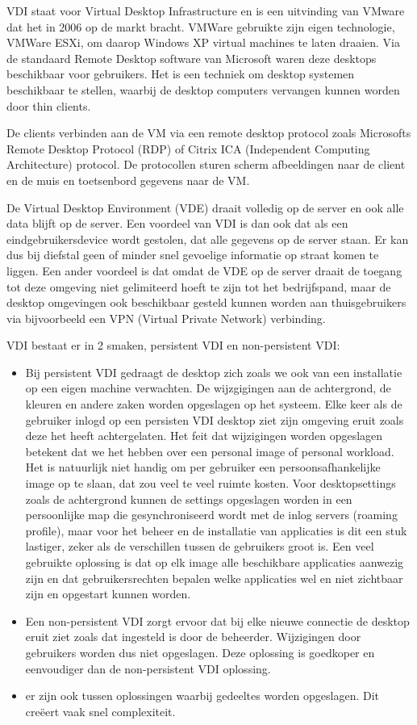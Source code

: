 VDI staat voor Virtual Desktop Infrastructure en is een uitvinding van VMware dat het in 2006 op de markt bracht. VMWare gebruikte zijn eigen technologie, VMWare ESXi, om daarop Windows XP virtual machines te laten draaien. Via de standaard Remote Desktop software van Microsoft waren deze desktops beschikbaar voor gebruikers. Het is een techniek om desktop systemen beschikbaar te stellen, waarbij de desktop computers vervangen kunnen worden door thin clients.

De clients verbinden aan de VM via een remote desktop protocol zoals Microsofts Remote Desktop Protocol (RDP) of Citrix ICA (Independent Computing Architecture) protocol. De protocollen sturen scherm afbeeldingen naar de client en de muis en toetsenbord gegevens naar de VM.

De Virtual Desktop Environment (VDE) draait volledig op de server en ook alle data blijft op de server. Een voordeel van VDI is dan ook dat als een eindgebruikersdevice wordt gestolen, dat alle gegevens op de server staan. Er kan dus bij diefstal geen of minder snel gevoelige informatie op straat komen te liggen. Een ander voordeel is dat omdat de VDE op de server draait de toegang tot deze omgeving niet gelimiteerd hoeft te zijn tot het bedrijfspand, maar de desktop omgevingen ook beschikbaar gesteld kunnen worden aan thuisgebruikers via bijvoorbeeld een VPN (Virtual Private Network) verbinding.

VDI bestaat er in 2 smaken, persistent VDI en non-persistent VDI:
\begin{itemize}
\item Bij persistent VDI gedraagt de desktop zich zoals we ook van een installatie op een eigen machine verwachten. De wijzgigingen aan de achtergrond, de kleuren en andere zaken worden opgeslagen op het systeem. Elke keer als de gebruiker inlogd op een persisten VDI desktop ziet zijn omgeving eruit zoals deze het heeft achtergelaten. Het feit dat wijzigingen worden opgeslagen betekent dat we het hebben over een personal image of personal workload. Het is natuurlijk niet handig om per gebruiker een persoonsafhankelijke image op te slaan, dat zou veel te veel ruimte kosten. Voor desktopsettings zoals de achtergrond kunnen de settings opgeslagen worden in een persoonlijke map die gesynchroniseerd wordt met de inlog servers (roaming profile), maar voor het beheer en de installatie van applicaties is dit een stuk lastiger, zeker als de verschillen tussen de gebruikers groot is. Een veel gebruikte oplossing is dat op elk image alle beschikbare applicaties aanwezig zijn en dat gebruikersrechten bepalen welke applicaties wel en niet zichtbaar zijn en opgestart kunnen worden.
\item Een non-persistent VDI zorgt ervoor dat bij elke nieuwe connectie de desktop eruit ziet zoals dat ingesteld is door de beheerder. Wijzigingen door gebruikers worden dus niet opgeslagen. Deze oplossing is goedkoper en eenvoudiger dan de non-persistent VDI oplossing.
\item er zijn ook tussen oplossingen waarbij gedeeltes worden opgeslagen. Dit cre\"eert vaak snel complexiteit.
\end{itemize}
